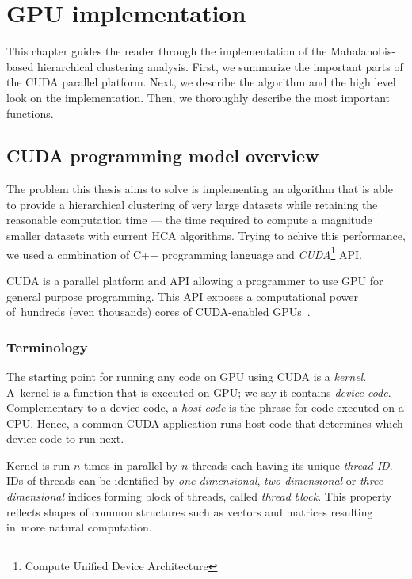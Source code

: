 \chapter{GPU implementation}

This chapter guides the reader through the implementation of the Mahalanobis-based hierarchical clustering analysis. First, we summarize the important parts of the CUDA parallel platform. Next, we describe the algorithm and the high level look on the implementation. Then, we thoroughly describe the most important functions.

\section{CUDA programming model overview}

The problem this thesis aims to solve is implementing an algorithm that is able to provide a hierarchical clustering of very large datasets while retaining the reasonable computation time --- the time required to compute a magnitude smaller datasets with current HCA algorithms.
Trying to achive this performance, we used a combination of C++ programming language and \emph{CUDA}\footnote{Compute Unified Device Architecture} API.

CUDA is a parallel platform and API allowing a programmer to use GPU for general purpose programming. This API exposes a computational power of~hundreds (even thousands) cores of CUDA-enabled GPUs~\cite{cuda}.


\subsection{Terminology}

The starting point for running any code on GPU using CUDA is a \emph{kernel}. A~kernel is a function that is executed on GPU; we say it contains \emph{device code}. Complementary to a device code, a \emph{host code} is the phrase for code executed on a CPU. Hence, a common CUDA application runs host code that determines which device code to run next. 

Kernel is run $n$ times in parallel by $n$ threads each having its unique \emph{thread ID}. IDs of threads can be identified by \emph{one-dimensional}, \emph{two-dimensional} or \emph{three-dimensional} indices forming block of threads, called \emph{thread block}. This property reflects shapes of common structures such as vectors and matrices resulting in~more natural computation.

